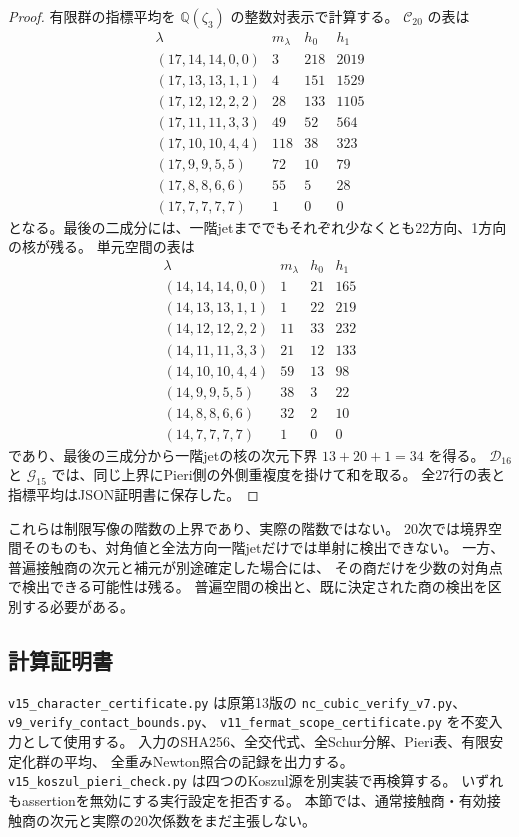 \begin{proof}
有限群の指標平均を $\mathbb Q(\zeta_3)$ の整数対表示で計算する。
$\mathcal C_{20}$ の表は
\[
\begin{array}{c|r|r|r}
\lambda&m_\lambda&h_0&h_1\\\hline
(17,14,14,0,0)&3&218&2019\\
(17,13,13,1,1)&4&151&1529\\
(17,12,12,2,2)&28&133&1105\\
(17,11,11,3,3)&49&52&564\\
(17,10,10,4,4)&118&38&323\\
(17,9,9,5,5)&72&10&79\\
(17,8,8,6,6)&55&5&28\\
(17,7,7,7,7)&1&0&0
\end{array}
\]
となる。最後の二成分には、一階jetまででもそれぞれ少なくとも22方向、1方向の核が残る。
単元空間の表は
\[
\begin{array}{c|r|r|r}
\lambda&m_\lambda&h_0&h_1\\\hline
(14,14,14,0,0)&1&21&165\\
(14,13,13,1,1)&1&22&219\\
(14,12,12,2,2)&11&33&232\\
(14,11,11,3,3)&21&12&133\\
(14,10,10,4,4)&59&13&98\\
(14,9,9,5,5)&38&3&22\\
(14,8,8,6,6)&32&2&10\\
(14,7,7,7,7)&1&0&0
\end{array}
\]
であり、最後の三成分から一階jetの核の次元下界 $13+20+1=34$ を得る。
$\mathcal D_{16}$ と $\mathcal G_{15}$ では、同じ上界にPieri側の外側重複度を掛けて和を取る。
全27行の表と指標平均はJSON証明書に保存した。
\end{proof}

これらは制限写像の階数の上界であり、実際の階数ではない。
20次では境界空間そのものも、対角値と全法方向一階jetだけでは単射に検出できない。
一方、普遍接触商の次元と補元が別途確定した場合には、
その商だけを少数の対角点で検出できる可能性は残る。
普遍空間の検出と、既に決定された商の検出を区別する必要がある。

\subsection{計算証明書}

\nolinkurl{v15_character_certificate.py} は原第13版の
\nolinkurl{nc_cubic_verify_v7.py}、
\nolinkurl{v9_verify_contact_bounds.py}、
\nolinkurl{v11_fermat_scope_certificate.py} を不変入力として使用する。
入力のSHA256、全交代式、全Schur分解、Pieri表、有限安定化群の平均、
全重みNewton照合の記録を出力する。
\nolinkurl{v15_koszul_pieri_check.py} は四つのKoszul源を別実装で再検算する。
いずれもassertionを無効にする実行設定を拒否する。
本節では、通常接触商・有効接触商の次元と実際の20次係数をまだ主張しない。



